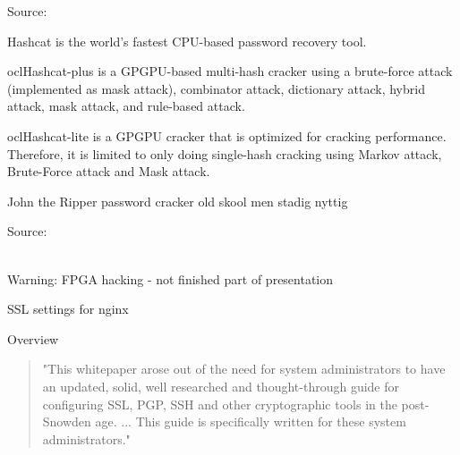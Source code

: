 \documentclass[20pt,landscape,a4paper]{foils}
\begin{document}
Source:\\





\begin{list2}
\item Hashcat is the world's fastest CPU-based password recovery tool.
\item oclHashcat-plus is a GPGPU-based multi-hash cracker using a brute-force attack (implemented as mask attack), combinator attack, dictionary attack, hybrid attack, mask attack, and rule-based attack.
\item oclHashcat-lite is a GPGPU cracker that is optimized for cracking performance. Therefore, it is limited to only doing single-hash cracking using Markov attack, Brute-Force attack and Mask attack.
\item John the Ripper password cracker old skool men stadig nyttig
\end{list2}

Source:\\
\\




Warning: FPGA hacking - not finished part of presentation





SSL settings for nginx

Overview
\begin{quote}
"This whitepaper arose out of the need for system administrators to have an updated,
solid, well researched and thought-through guide for configuring SSL, PGP, SSH and
other cryptographic tools in the post-Snowden age. ... This guide is specifically
written for these system administrators."
\end{quote}



\end{document}
